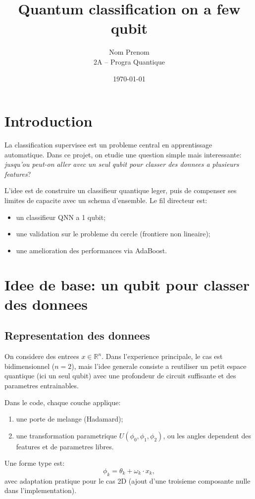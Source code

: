 \documentclass[11pt,a4paper]{article}
\title{Quantum classification on a few qubit}
\author{Nom Prenom\\2A -- Progra Quantique}
\date{\today}
\begin{document}
\maketitle
\tableofcontents
\newpage

\section{Introduction}
La classification supervisee est un probleme central en apprentissage automatique. Dans ce projet, on etudie une question simple mais interessante: \emph{jusqu'ou peut-on aller avec un seul qubit pour classer des donnees a plusieurs features}?

L'idee est de construire un classifieur quantique leger, puis de compenser ses limites de capacite avec un schema d'ensemble. Le fil directeur est:
\begin{itemize}
  \item un classifieur QNN a 1 qubit;
  \item une validation sur le probleme du cercle (frontiere non lineaire);
  \item une amelioration des performances via AdaBoost.
\end{itemize}

\section{Idee de base: un qubit pour classer des donnees}
\subsection{Representation des donnees}
On considere des entrees $x \in \mathbb{R}^n$. Dans l'experience principale, le cas est bidimensionnel ($n=2$), mais l'idee generale consiste a reutiliser un petit espace quantique (ici un seul qubit) avec une profondeur de circuit suffisante et des parametres entrainables.

Dans le code, chaque couche applique:
\begin{enumerate}
  \item une porte de melange (Hadamard);
  \item une transformation parametrique $U(\phi_0,\phi_1,\phi_2)$, ou les angles dependent des features et de parametres libres.
\end{enumerate}

Une forme type est:
\[
\phi_k = \theta_k + \omega_k \cdot x_k,
\]
avec adaptation pratique pour le cas 2D (ajout d'une troisieme composante nulle dans l'implementation).
\end{document}
